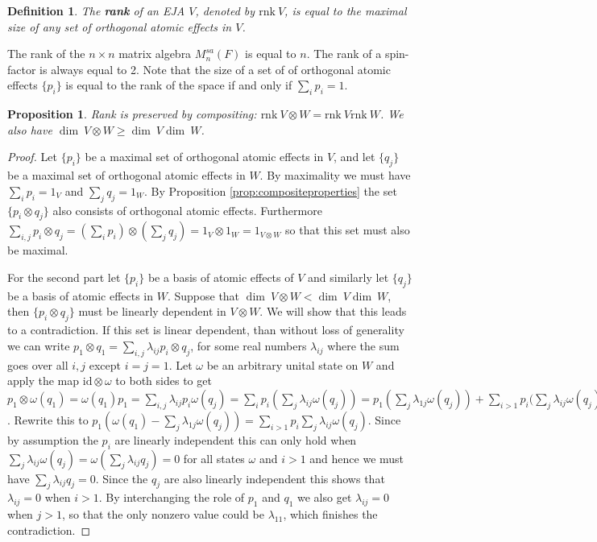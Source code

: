 \documentclass[b5paper,onecolumn,12pt,accepted=2019-05-03, issue=1, volume=1, shorttitle=papers/compositionality-1-1]{compositionalityarticle}
\newcounter{counter}
\numberwithin{counter}{section}
\newtheorem{proposition}[counter]{Proposition}
\newtheorem{definition}[counter]{Definition}
\newcommand{\rnk}{\text{rnk}\xspace}
\newcommand{\id}{\text{id}}
\begin{document}
\begin{definition}
    The \textbf{rank} of an EJA $V$, denoted by $\rnk~V$, is equal to the maximal size of any set of orthogonal atomic effects in $V$.
\end{definition}
\noindent The rank of the $n\times n$ matrix algebra $M_n^{sa}(F)$ is equal to $n$. The rank of a spin-factor is always equal to 2. Note that the size of a set of of orthogonal atomic effects $\{p_i\}$ is equal to the rank of the space if and only if $\sum_i p_i = 1$.

\begin{proposition}\label{prop:rankcomposite}
    Rank is preserved by compositing: $\rnk~V\otimes W = \rnk~V \rnk~W$. We also have $\dim~V\otimes W \geq \dim~V \dim~W$.
\end{proposition}
\begin{proof}
    Let $\{p_i\}$ be a maximal set of orthogonal atomic effects in $V$, and let $\{q_j\}$ be a maximal set of orthogonal atomic effects in $W$. By maximality we must have $\sum_i p_i = 1_V$ and $\sum_j q_j = 1_W$. By Proposition \ref{prop:compositeproperties} the set $\{p_i\otimes q_j\}$ also consists of orthogonal atomic effects. Furthermore $\sum_{i,j} p_i\otimes q_j = (\sum_i p_i)\otimes (\sum_j q_j) = 1_V\otimes 1_W = 1_{V\otimes W}$ so that this set must also be maximal.

    For the second part let $\{p_i\}$ be a basis of atomic effects of $V$ and similarly let $\{q_j\}$ be a basis of atomic effects in $W$. Suppose that $\dim~V\otimes W < \dim~V \dim~W$, then $\{p_i \otimes q_j\}$ must be linearly dependent in $V\otimes W$. We will show that this leads to a contradiction.
    If this set is linear dependent, than without loss of generality we can write $p_1\otimes q_1 = \sum_{i,j} \lambda_{ij} p_i\otimes q_j$, for some real numbers $\lambda_{ij}$ where the sum goes over all $i,j$ except $i=j=1$. 
    Let $\omega$ be an arbitrary unital state on $W$ and apply the map $\id\otimes \omega$ to both sides to get $p_1\otimes \omega(q_1) = \omega(q_1) p_1 = \sum_{i,j} \lambda_{ij} p_i \omega(q_j) = \sum_i p_i (\sum_j \lambda_{ij}\omega(q_j)) = p_1(\sum_j \lambda_{1j} \omega(q_j)) + \sum_{i>1} p_i (\sum_j \lambda_{ij}\omega(q_j)$.
    Rewrite this to $p_1(\omega(q_1)-\sum_j \lambda_{1j} \omega(q_j)) = \sum_{i>1} p_i \sum_j \lambda_{ij}\omega(q_j)$. Since by assumption the $p_i$ are linearly independent this can only hold when $\sum_j \lambda_{ij} \omega(q_j) = \omega(\sum_j \lambda_{ij} q_j) =  0$ for all states $\omega$ and $i>1$ and hence we must have $\sum_j \lambda_{ij} q_j = 0$. Since the $q_j$ are also linearly independent this shows that $\lambda_{ij} = 0$ when $i>1$. By interchanging the role of $p_1$ and $q_1$ we also get $\lambda_{ij} = 0$ when $j>1$, so that the only nonzero value could be $\lambda_{11}$, which finishes the contradiction.
\end{proof}
\end{document}
